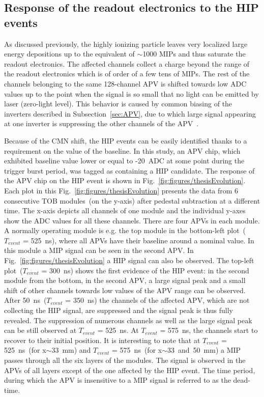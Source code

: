 

\subsection{Response of the readout electronics to the HIP events}

As discussed previously, the highly ionizing particle leaves very localized large energy depositions up to the equivalent of $\sim$1000 MIPs and thus saturate the readout electronics. The affected channels collect a charge beyond the range of the readout electronics which is of order of a few tens of MIPs. The rest of the channels belonging to the same 128-channel APV is shifted towards low ADC values up to the point when the signal is so small that no light can be emitted by laser (zero-light level). This behavior is caused by common biasing of the inverters described in Subsection~\ref{sec:APV}, due to which large signal appearing at one inverter is suppressing the other channels of the APV~\cite{Bainbridge:2004jc}. 

Because of the CMN shift, the HIP events can be easily identified thanks to a requirement on the value of the baseline. In this study, an APV chip, which exhibited baseline value lower or equal to -20~ADC at some point during the trigger burst period, was tagged as containing a  HIP candidate. The response of the APV chip on the HIP event is shown in Fig.~\ref{fig:figures/thesisEvolution}. Each plot in this Fig.~\ref{fig:figures/thesisEvolution} presents the data from 6 consecutive TOB modules~(on the y-axis) after pedestal subtraction at a different time. The x-axis depicts all channels of one module and the individual y-axes show the ADC values for all these channels. There are four APVs in each module. A normally operating module is e.g. the top module in the bottom-left plot~($T_{event}$ = 525~ns), where all APVs have their baseline around a nominal value. In this module a MIP signal can be seen in the second APV. In Fig.~\ref{fig:figures/thesisEvolution} a HIP signal can also be observed. The top-left plot~($T_{event}$ = 300~ns) shows the first evidence of the HIP event: in the second module from the bottom, in the second APV, a large signal peak and a small shift of other channels towards low values of the APV range can be observed. After 50~ns~($T_{event}$ = 350~ns) the channels of the affected APV, which are not collecting the HIP signal, are suppressed and the signal peak is thus fully revealed. The suppression of numerous channels as well as the large signal peak can be still observed at $T_{event}$ = 525~ns. At $T_{event}$ = 575~ns, the channels start to recover to their initial position. It is interesting to note that at $T_{event}$ = 525~ns~(for x$\sim$33~mm) and $T_{event}$ = 575~ns~(for x$\sim$33~and~50~mm) a MIP passes through all the six layers of the modules. The signal is observed in the APVs of all layers except of the one affected by the HIP event. The time period, during which the APV is insensitive to a MIP signal is referred to as the dead-time.

